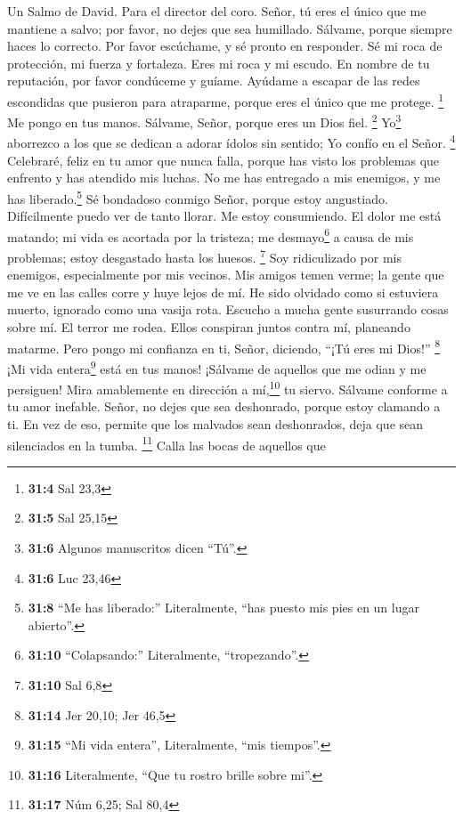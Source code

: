 Un Salmo de David. Para el director del coro.  Señor, tú
eres el único que me mantiene a salvo; por favor, no dejes que sea
humillado. Sálvame, porque siempre haces lo correcto.  Por
favor escúchame, y sé pronto en responder. Sé mi roca de protección, mi
fuerza y fortaleza.  Eres mi roca y mi escudo. En nombre
de tu reputación, por favor condúceme y guíame.  Ayúdame a
escapar de las redes escondidas que pusieron para atraparme, porque eres
el único que me protege. \footnote{\textbf{31:4} Sal 23,3}
 Me pongo en tus manos. Sálvame, Señor, porque eres un
Dios fiel. \footnote{\textbf{31:5} Sal 25,15} 
Yo\footnote{\textbf{31:6} Algunos manuscritos dicen ``Tú''.} aborrezco a
los que se dedican a adorar ídolos sin sentido; Yo confío en el Señor.
\footnote{\textbf{31:6} Luc 23,46}  Celebraré, feliz en tu
amor que nunca falla, porque has visto los problemas que enfrento y has
atendido mis luchas.  No me has entregado a mis enemigos,
y me has liberado.\footnote{\textbf{31:8} ``Me has liberado:''
  Literalmente, ``has puesto mis pies en un lugar abierto''.}
 Sé bondadoso conmigo Señor, porque estoy angustiado.
Difícilmente puedo ver de tanto llorar. Me estoy consumiendo.
 El dolor me está matando; mi vida es acortada por la
tristeza; me desmayo\footnote{\textbf{31:10} ``Colapsando:''
  Literalmente, ``tropezando''.} a causa de mis problemas; estoy
desgastado hasta los huesos. \footnote{\textbf{31:10} Sal 6,8}
 Soy ridiculizado por mis enemigos, especialmente por mis
vecinos. Mis amigos temen verme; la gente que me ve en las calles corre
y huye lejos de mí.  He sido olvidado como si estuviera
muerto, ignorado como una vasija rota.  Escucho a mucha
gente susurrando cosas sobre mí. El terror me rodea. Ellos conspiran
juntos contra mí, planeando matarme.  Pero pongo mi
confianza en ti, Señor, diciendo, ``¡Tú eres mi Dios!'' \footnote{\textbf{31:14}
  Jer 20,10; Jer 46,5}  ¡Mi vida entera\footnote{\textbf{31:15}
  ``Mi vida entera'', Literalmente, ``mis tiempos''.} está en tus manos!
¡Sálvame de aquellos que me odian y me persiguen!  Mira
amablemente en dirección a mí,\footnote{\textbf{31:16} Literalmente,
  ``Que tu rostro brille sobre mi''.} tu siervo. Sálvame conforme a tu
amor inefable.  Señor, no dejes que sea deshonrado,
porque estoy clamando a ti. En vez de eso, permite que los malvados sean
deshonrados, deja que sean silenciados en la tumba. \footnote{\textbf{31:17}
  Núm 6,25; Sal 80,4}  Calla las bocas de aquellos que
